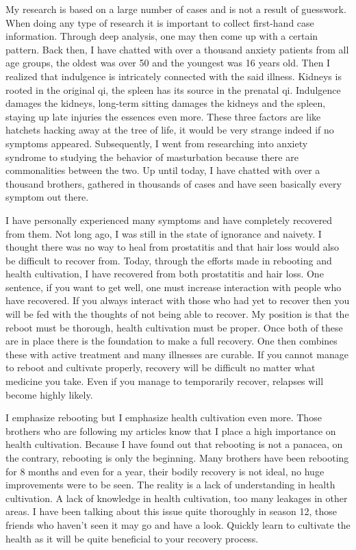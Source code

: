 \documentclass[
]{book}
\begin{document}
My research is based on a large number of cases and is not a result of guesswork. When doing any type of research it is important to collect first-hand case information. Through deep analysis, one may then come up with a certain pattern. Back then, I have chatted with over a thousand anxiety patients from all age groups, the oldest was over 50 and the youngest was 16 years old. Then I realized that indulgence is intricately connected with the said illness. Kidneys is rooted in the original qi, the spleen has its source in the prenatal qi. Indulgence damages the kidneys, long-term sitting damages the kidneys and the spleen, staying up late injuries the essences even more. These three factors are like hatchets hacking away at the tree of life, it would be very strange indeed if no symptoms appeared. Subsequently, I went from researching into anxiety syndrome to studying the behavior of masturbation because there are commonalities between the two. Up until today, I have chatted with over a thousand brothers, gathered in thousands of cases and have seen basically every symptom out there.

I have personally experienced many symptoms and have completely recovered from them. Not long ago, I was still in the state of ignorance and naivety. I thought there was no way to heal from prostatitis and that hair loss would also be difficult to recover from. Today, through the efforts made in rebooting and health cultivation, I have recovered from both prostatitis and hair loss. One sentence, if you want to get well, one must increase interaction with people who have recovered. If you always interact with those who had yet to recover then you will be fed with the thoughts of not being able to recover. My position is that the reboot must be thorough, health cultivation must be proper. Once both of these are in place there is the foundation to make a full recovery. One then combines these with active treatment and many illnesses are curable. If you cannot manage to reboot and cultivate properly, recovery will be difficult no matter what medicine you take. Even if you manage to temporarily recover, relapses will become highly likely.

I emphasize rebooting but I emphasize health cultivation even more. Those brothers who are following my articles know that I place a high importance on health cultivation. Because I have found out that rebooting is not a panacea, on the contrary, rebooting is only the beginning. Many brothers have been rebooting for 8 months and even for a year, their bodily recovery is not ideal, no huge improvements were to be seen. The reality is a lack of understanding in health cultivation. A lack of knowledge in health cultivation, too many leakages in other areas. I have been talking about this issue quite thoroughly in season 12, those friends who haven't seen it may go and have a look. Quickly learn to cultivate the health as it will be quite beneficial to your recovery process.
\end{document}
